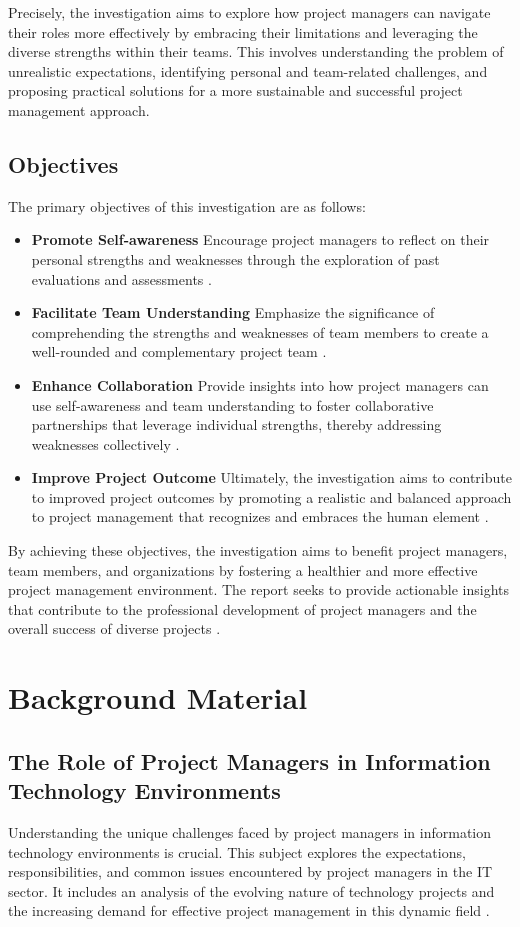 \documentclass[11pt]{article}
\begin{document}
Precisely, the investigation aims to explore how project managers can navigate their roles more effectively by embracing their limitations and leveraging the diverse strengths within their teams. This involves understanding the problem of unrealistic expectations, identifying personal and team-related challenges, and proposing practical solutions for a more sustainable and successful project management approach.

\subsection{Objectives}
The primary objectives of this investigation are as follows:
\begin{itemize}
\item \textbf{Promote Self-awareness} Encourage project managers to reflect on their personal strengths and weaknesses through the exploration of past evaluations and assessments  \cite{SchockSmith2017}.
\item \textbf{Facilitate Team Understanding} Emphasize the significance of comprehending the strengths and weaknesses of team members to create a well-rounded and complementary project team \cite{ProjectManagementInstitute2009}.
\item \textbf{Enhance Collaboration} Provide insights into how project managers can use self-awareness and team understanding to foster collaborative partnerships that leverage individual strengths, thereby addressing weaknesses collectively \cite{Zulch2014}.
\item \textbf{Improve Project Outcome} Ultimately, the investigation aims to contribute to improved project outcomes by promoting a realistic and balanced approach to project management that recognizes and embraces the human element \cite{JohnsonLinkedIn}.
\end{itemize}
By achieving these objectives, the investigation aims to benefit project managers, team members, and organizations by fostering a healthier and more effective project management environment. The report seeks to provide actionable insights that contribute to the professional development of project managers and the overall success of diverse projects \cite{Simplilearn}.

\section{Background Material}
\subsection{The Role of Project Managers in Information Technology Environments}
Understanding the unique challenges faced by project managers in information technology environments is crucial. This subject explores the expectations, responsibilities, and common issues encountered by project managers in the IT sector. It includes an analysis of the evolving nature of technology projects and the increasing demand for effective project management in this dynamic field \cite{Williams2011}.
\end{document}
